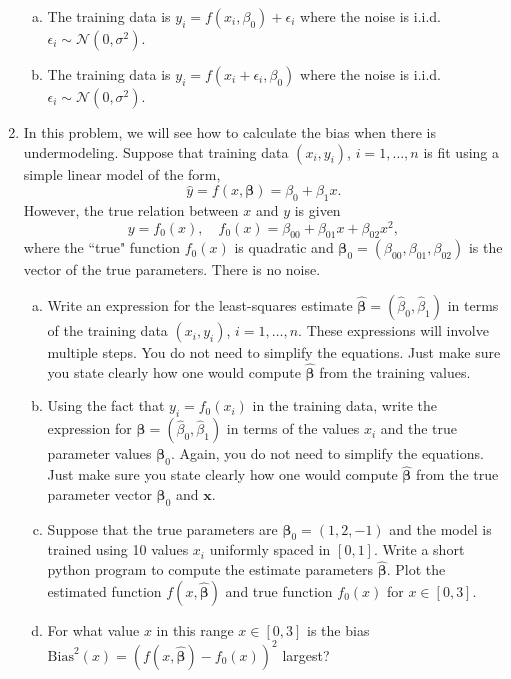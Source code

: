\documentclass[11pt]{article}
\newcommand{\xbf}{\mathbf{x}}
\def\betahat{\widehat{\beta}}
\def\betabf{{\boldsymbol \beta}}
\def\betabfhat{{\widehat{\bm{\beta}}}}
\begin{document}
\begin{enumerate}
\begin{enumerate}[(a)]
\item The training data is $y_i = f(x_i,\beta_0) + \epsilon_i$ where 
the noise is i.i.d.\  $\epsilon_i \sim {\mathcal N}(0,\sigma^2)$.

\item The training data is $y_i = f(x_i+\epsilon_i,\beta_0)$ where
the noise is i.i.d.\ $\epsilon_i \sim {\mathcal N}(0,\sigma^2)$.

\end{enumerate}


\item In this problem, we will see how to calculate the bias when
there is undermodeling.  Suppose that training data $(x_i,y_i)$, $i=1,\ldots,n$
is fit using a simple linear model of the form,
\[
    \hat{y} = f(x,\betabf) = \beta_0 + \beta_1 x.
\]
However, the true relation between $x$ and $y$ is given
\[
    y = f_0(x), \quad f_0(x)=\beta_{00} + \beta_{01}x + \beta_{02} x^2,
\]
where the ``true" function $f_0(x)$ is quadratic and
$\betabf_0=(\beta_{00},\beta_{01},\beta_{02})$ is the vector of the true parameters. There is no noise.
\begin{enumerate}[(a)]
\item Write an expression
for the least-squares estimate $\betabfhat = (\betahat_0,\betahat_1)$ in terms of the training data
$(x_i,y_i)$, $i=1,\ldots,n$.
These expressions will  involve multiple steps.
You do not need to simplify the equations.
Just make sure you state clearly how one would compute $\betabfhat$ from the training values.

\item Using the fact that $y_i=f_0(x_i)$ in the training data, write the expression for
$\betabf = (\betahat_0,\betahat_1)$ in terms of the values $x_i$ and the true parameter
values $\betabf_0$.
Again, you do not need to simplify the equations.
Just make sure you state clearly how one would compute $\betabfhat$ from the true
parameter vector $\betabf_0$ and $\xbf$.

\item
Suppose that the true parameters are $\betabf_0=(1,2,-1)$ and
the model is trained using 10 values $x_i$ uniformly spaced in $[0,1]$.
Write a short python program to compute the estimate parameters $\betabfhat$.
Plot the estimated function $f(x,\betabfhat)$ and true function $f_0(x)$
 for $x \in [0,3]$.

\item For what value $x$ in this range $x \in [0,3]$ is the bias
$\mathrm{Bias}^2(x) = (f(x,\betabfhat)-f_0(x))^2$ largest?
\end{enumerate}



\end{enumerate}
\end{document}
